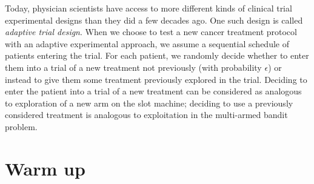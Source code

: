 \documentclass{article}
\begin{document}
Today, physician scientists have access to more different kinds of clinical trial experimental designs than they did a few decades ago. One such design is called \textit{adaptive trial design}. When we choose to test a new cancer treatment protocol with an adaptive experimental approach, we assume a sequential schedule of patients entering the trial. For each patient, we randomly decide whether to enter them into a trial of a new treatment not previously (with probability $\epsilon$) or instead to give them some treatment previously explored in the trial. Deciding to enter the patient into a trial of a new treatment can be considered as analogous to exploration of a new arm on the slot machine; deciding to use a previously considered treatment is analogous to exploitation in the multi-armed bandit problem.






\section{Warm up}
\end{document}
